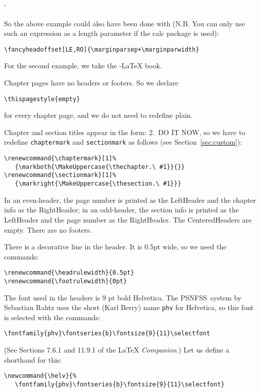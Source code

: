 `\documentclass[a4paper]{article}
\def\latex/{\protect\LaTeX{}}
\def\ams/{\protect\pAmS}
\def\pAmS{{\the\textfont2
        A\kern-.1667em\lower.5ex\hbox{M}\kern-.125emS}}
\def\amslatex/{\ams/-\latex/}
\newcommand{\PSNFSS}{{\sf
    PSNFSS}}
\newcommand{\bs}{\symbol{'134}}
\newcommand{\Cmd}[1]{\texttt{\def\{{\char`\{}\def\}{\char`\}}\bs#1}}
\begin{document}
So the above example could also have been done with (N.B. You can only use such an expression as a length parameter if the \textsf{calc} package is used):

\begin{verbatim}
\fancyheadoffset[LE,RO]{\marginparsep+\marginparwidth}
\end{verbatim}

For the second example, we take the \amslatex/ book.%

Chapter pages have no headers or footers.  So we declare

\begin{verbatim}
\thispagestyle{empty}
\end{verbatim}
for every chapter page, and we do not need to redefine plain.

Chapter and section titles appear in the form: 2.\ DO IT NOW, so we have
to redefine \Cmd{chaptermark} and \Cmd{sectionmark} as follows (see
Section~\ref{sec:custom}):

\begin{verbatim}
\renewcommand{\chaptermark}[1]%
   {\markboth{\MakeUppercase{\thechapter.\ #1}}{}}
\renewcommand{\sectionmark}[1]%
   {\markright{\MakeUppercase{\thesection.\ #1}}}
\end{verbatim}

In an even-header, the page number is printed as the LeftHeader and
the chapter info as the RightHeader; in an odd-header, the section info
is printed as the LeftHeader and the page number as the RightHeader.  The
CenteredHeaders are empty.  There are no footers.

There is a decorative line in the header.  It is 0.5pt wide, so we need
the commands:

\begin{verbatim}
\renewcommand{\headrulewidth}{0.5pt}
\renewcommand{\footrulewidth}{0pt}
\end{verbatim}

The font used in the headers is 9 pt bold Helvetica.  The \PSNFSS\ system
by Sebastian Rahtz uses the short (Karl Berry) name \verb|phv| for
Helvetica, so this font is selected with the commands:
\begin{verbatim}
\fontfamily{phv}\fontseries{b}\fontsize{9}{11}\selectfont
\end{verbatim}
(See Sections 7.6.1 and 11.9.1 of the \latex/ \emph{Companion}.)
Let us define a shorthand for this:
\begin{verbatim}
\newcommand{\helv}{%
   \fontfamily{phv}\fontseries{b}\fontsize{9}{11}\selectfont}
\end{verbatim}
\end{document}
